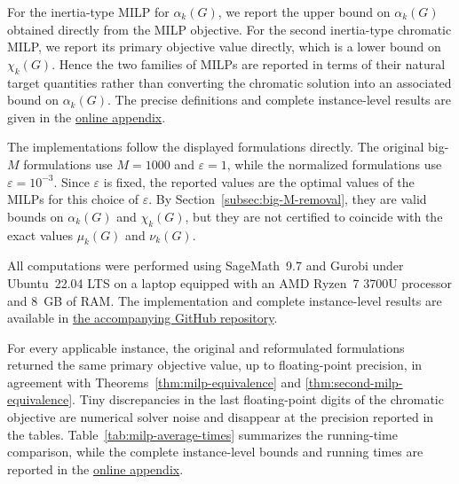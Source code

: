 \documentclass[10pt]{article}
\begin{document}
For the inertia-type MILP for \(\alpha_k(G)\), we report the upper bound
on \(\alpha_k(G)\) obtained directly from the MILP objective. For the
second inertia-type chromatic MILP, we report its primary objective value
directly, which is a lower bound on \(\chi_k(G)\). Hence the two families
of MILPs are reported in terms of their natural target quantities rather
than converting the chromatic solution into an associated bound on
\(\alpha_k(G)\). The precise definitions and complete instance-level
results are given in the \href{https://github.com/Valentin-Michaux/Optimization-of-inertia-type-bounds-on-the-independence-and-chromatic-numbers-of-graph-powers/blob/main/Online%20Appendix.pdf}
{online appendix}.

The implementations follow the displayed formulations directly.
The original big-\(M\) formulations use \(M=1000\) and
\(\varepsilon=1\), while the normalized formulations use
\(\varepsilon=10^{-3}\). Since \(\varepsilon\) is fixed, the
reported values are the optimal values of the MILPs for this choice of
\(\varepsilon\). By Section~\ref{subsec:big-M-removal}, they are valid bounds on
\(\alpha_k(G)\) and \(\chi_k(G)\), but they are not certified to
coincide with the exact values \(\mu_k(G)\) and \(\nu_k(G)\).

All computations were performed using SageMath~9.7 and Gurobi under
Ubuntu~22.04 LTS on a laptop equipped with an AMD Ryzen~7 3700U processor
and 8~GB of RAM. The implementation and complete instance-level results
are available in \href{https://github.com/Valentin-Michaux/Optimization-of-inertia-type-bounds-on-the-independence-and-chromatic-numbers-of-graph-powers}
{the accompanying GitHub repository}.

For every applicable instance, the original and reformulated formulations
returned the same primary objective value, up to floating-point precision,
in agreement with Theorems~\ref{thm:milp-equivalence} and
\ref{thm:second-milp-equivalence}. Tiny discrepancies in the last
floating-point digits of the chromatic objective are numerical solver
noise and disappear at the precision reported in the tables.
Table~\ref{tab:milp-average-times} summarizes the running-time comparison, while the complete instance-level
bounds and running times are reported in the \href{https://github.com/Valentin-Michaux/Optimization-of-inertia-type-bounds-on-the-independence-and-chromatic-numbers-of-graph-powers/blob/main/Online%20Appendix.pdf}
{online appendix}.
\end{document}
